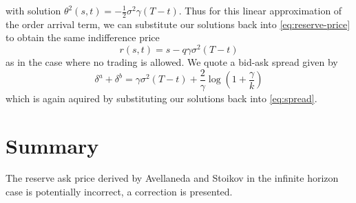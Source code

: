 with solution $\theta^2(s,t)=-\frac{1}{2}\sigma^2\gamma(T-t)$.
Thus for this linear approximation of the order arrival term, we can substitute our
solutions back into \ref{eq:reserve-price} to obtain the same indifference price
\begin{equation}
    r(s,t)=s-q\gamma\sigma^2(T-t)
\end{equation}
as in the case where no trading is allowed. We quote a bid-ask spread given by
\begin{equation}
    \delta^a+\delta^b=\gamma\sigma^2(T-t)+\frac{2}{\gamma}\log\left(1+\frac{\gamma}{k}\right)
\end{equation}
which is again aquired by substituting our solutions back into \ref{eq:spread}.

\section{Summary}\label{sec:3.9}
The reserve ask price derived by Avellaneda and Stoikov in the infinite horizon case
is potentially incorrect, a correction is presented.